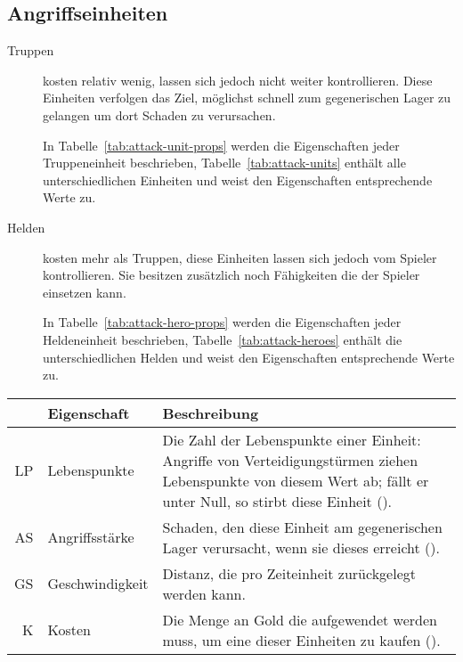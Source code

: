 \subsection{Angriffseinheiten}

\begin{description}
  \item[Truppen]
    kosten relativ wenig, lassen sich jedoch nicht weiter kontrollieren. Diese
    Einheiten verfolgen das Ziel, möglichst schnell zum gegenerischen Lager zu
    gelangen um dort Schaden zu verursachen.

    In Tabelle~\ref{tab:attack-unit-props} werden die Eigenschaften jeder
    Truppeneinheit beschrieben, Tabelle~\ref{tab:attack-units} enthält alle
    unterschiedlichen Einheiten und weist den Eigenschaften entsprechende Werte
    zu.

  \item[Helden] kosten mehr als Truppen, diese Einheiten lassen sich jedoch vom
    Spieler kontrollieren. Sie besitzen zusätzlich noch Fähigkeiten die der
    Spieler einsetzen kann.

    In Tabelle~\ref{tab:attack-hero-props} werden die Eigenschaften jeder
    Heldeneinheit beschrieben, Tabelle~\ref{tab:attack-heroes} enthält die
    unterschiedlichen Helden und weist den Eigenschaften entsprechende Werte
    zu.
\end{description}

\begin{table}[htbp]
  \caption{Eigenschaften von Truppen}
  \label{tab:attack-unit-props}
  \small
  \begin{longtabu}{rlX}
    \toprule\rowfont{\itshape}
    & Eigenschaft & Beschreibung \\
    \midrule

    LP & Lebenspunkte
       & Die Zahl der Lebenspunkte einer Einheit: Angriffe von
         Verteidigungstürmen ziehen Lebenspunkte von diesem Wert ab; fällt er
         unter Null, so stirbt diese Einheit (). \\
    AS & Angriffsstärke
       & Schaden, den diese Einheit am gegenerischen Lager verursacht, wenn sie
         dieses erreicht (). \\
    GS & Geschwindigkeit & Distanz, die pro Zeiteinheit zurückgelegt werden
         kann. \\
    K  & Kosten
       & Die Menge an Gold die aufgewendet werden muss, um eine dieser
         Einheiten zu kaufen (). \\

    \bottomrule
  \end{longtabu}
\end{table}


